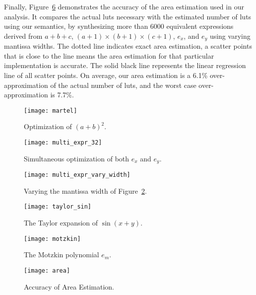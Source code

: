 Finally, Figure~\ref{so:fig:area} demonstrates the accuracy of the area
estimation used in our analysis. It compares the actual \glspl{lut} necessary
with the estimated number of \glspl{lut} using our semantics, by synthesizing
more than 6000 equivalent expressions derived from $a + b + c$, $(a + 1) \times
(b + 1) \times (c + 1)$, $e_x$, and $e_y$ using varying mantissa widths. The
dotted line indicates exact area estimation, a scatter points that is close
to the line means the area estimation for that particular implementation is
accurate. The solid black line represents the linear regression line of all
scatter points. On average, our area estimation is a 6.1\% over-approximation
of the actual number of \glspl{lut}, and the worst case over-approximation is
7.7\%.
\newcommand{\figsize}{0.5}
\begin{figure}[ht]
    \centering
    \texttt{[image: martel]}
    \caption{Optimization of ${(a + b)}^2$.}\label{so:fig:martel}
\end{figure}
\begin{figure}[ht]
    \centering
    \texttt{[image: multi\_expr\_32]}
    \caption{Simultaneous optimization of both $e_x$ and $e_y$.}
    {}\label{so:fig:multi_expr_32}
\end{figure}
\begin{figure}[ht]
    \centering
    \texttt{[image: multi\_expr\_vary\_width]}
    \caption{Varying the mantissa width of Figure~\ref{so:fig:multi_expr_32}.}
    {}\label{so:fig:multi_expr_vary_width}
\end{figure}
\begin{figure}[ht]
    \centering
    \texttt{[image: taylor\_sin]}
    \caption{The Taylor expansion of $\sin(x + y)$.}
    {}\label{so:fig:taylor_sin}
\end{figure}
\begin{figure}[ht]
    \centering
    \texttt{[image: motzkin]}
    \caption{The Motzkin polynomial $e_m$.}\label{so:fig:motzkin}
\end{figure}
\begin{figure}[ht]
    \centering
    \texttt{[image: area]}
    \caption{Accuracy of Area Estimation.}\label{so:fig:area}
\end{figure}
